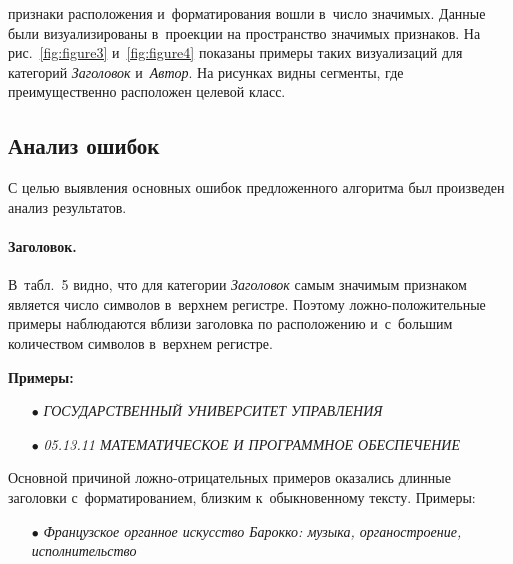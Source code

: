 \begin{multicols}{2}

\noindent
 признаки расположения и~форматирования вошли в~число значимых. 
Данные были визуализированы в~проекции на про\-стран\-ст\-во значимых при\-зна\-ков. На 
рис.~\ref{fig:figure3} и~\ref{fig:figure4} показаны примеры таких визуализаций 
для категорий \textit{Заголовок} и~\textit{Автор}. На рисунках видны сегменты, 
где преимущественно расположен целевой класс.





    
\vspace*{-6pt}


\subsection{Анализ ошибок}

С целью выявления основных ошибок предложенного алгоритма был произведен анализ 
результатов.

\vspace*{-12pt}

\paragraph*{Заголовок.}
В~табл.~5 видно, что для категории \textit{Заголовок} самым 
значимым признаком является число символов в~верхнем регистре. Поэтому 
лож\-но-по\-ло\-жи\-тель\-ные примеры наблюдаются вбли\-зи заголовка по расположению 
и~с~большим 
количеством символов в~верхнем ре\-гистре.

\textbf{Примеры:}

\begin{itemize}
\item[$\bullet$]
\textit{ГОСУДАРСТВЕННЫЙ УНИВЕРСИТЕТ УПРАВ\-ЛЕ\-НИЯ}

\item[$\bullet$]
\textit{05.13.11 МАТЕМАТИЧЕСКОЕ И ПРО\-ГРАМ\-МНОЕ ОБЕСПЕЧЕНИЕ}
\end{itemize}

Основной причиной лож\-но-от\-ри\-ца\-тель\-ных примеров оказались длинные заголовки 
с~форматированием, близким к~обыкновенному тексту. 
Примеры:

\begin{itemize}
\item[$\bullet$]
\textit{Французское органное искусство Барокко: музыка, органостроение, 
исполнительство}\\[-14.5pt]


\end{itemize}
\end{multicols}
